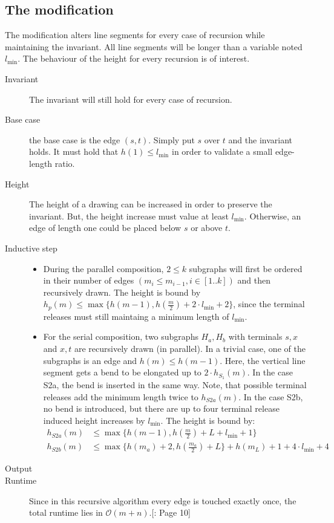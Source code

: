 \subsection{The modification}
The modification alters line segments for every case of recursion while maintaining the invariant. All line segments will be longer than a variable noted $l_{\min}$. The behaviour of the height for every recursion is of interest.
\begin{description}
	\item[Invariant] The invariant will still hold for every case of recursion.
	\item[Base case] the base case is the edge $(s,t)$. Simply put $s$ over $t$ and the invariant holds. It must hold that $h(1) \leq l_{\min}$ in order to validate a small edge-length ratio.
	\item[Height] The height of a drawing can be increased in order to preserve the invariant. But, the height increase must value at least $l_{\min}$. Otherwise, an edge of length one could be placed below $s$ or above $t$.
	\item[Inductive step] 
	\begin{itemize}
		\item During the parallel composition, $2\leq k$ subgraphs will first be ordered in their number of edges $(m_i \leq m_{i-1}, i \in[1..k])$ and then recursively drawn. The height is bound by $h_p(m)\leq\max\{h(m-1),h\left(\frac{m}{2}\right)+2\cdot l_{\min}+2\}$, since the terminal releases must still maintaing a minimum length of $l_{\min}$.
		\item For the serial composition, two subgraphs $H_a, H_b$ with terminals  $s,x$ and $x,t$ are recursively drawn (in parallel). In a trivial case, one of the subgraphs is an edge and $h(m)\leq h(m-1)$. Here, the vertical line segment gets a bend to be elongated up to $2\cdot h_{S_1}(m)$. In the case S2a, the bend is inserted in the same way. Note, that possible terminal releases add the minimum length twice to $h_{S2a}(m)$. In the case S2b, no bend is introduced, but there are up to four terminal release induced height increases by $l_{\min}$.
		The height is bound by:
		\begin{align}
			h_{S2a}(m)&\leq \max\{h(m-1),h\left(\frac{m}{2}\right)+L+l_{\min}+1\}\\
			h_{S2b}(m)&\leq \max\{h(m_a)+2,h\left(\frac{m_a}{2}\right)+L\}+h(m_L)+1 + 4\cdot l_{\min}+4
		\end{align}
	\end{itemize}
	\item[Output] 
	\item[Runtime] Since in this recursive algorithm every edge is touched exactly once, the total runtime lies in $\mathcal{O}(m+n)$.[\cite{DBLP:journals/dcg/Biedl11}: Page 10]
\end{description}
